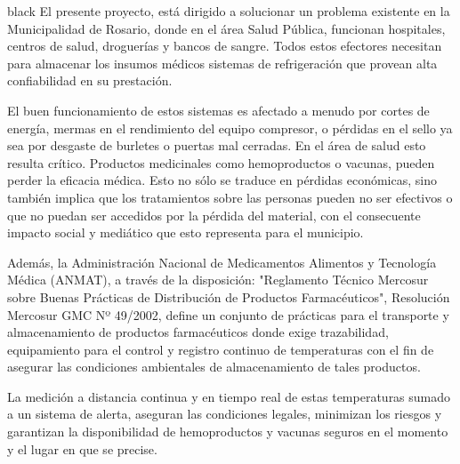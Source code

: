 \documentclass[11pt]{charter}
\begin{document}
\begin{consigna}{black}
El presente proyecto, está dirigido a solucionar un problema existente en la Municipalidad de Rosario, donde en el área Salud Pública, funcionan  hospitales, centros de salud, droguerías y bancos de sangre. Todos estos efectores necesitan para almacenar los insumos médicos sistemas de refrigeración que provean alta confiabilidad en su prestación.

El buen funcionamiento de estos sistemas es afectado a menudo por cortes de energía, mermas en el rendimiento del equipo compresor, o pérdidas en el sello ya sea por desgaste de burletes o puertas mal cerradas.
En el área de salud esto resulta crítico. Productos medicinales como hemoproductos o vacunas, pueden perder la eficacia médica. Esto no sólo se traduce en pérdidas económicas, sino también implica que los tratamientos sobre las personas pueden no ser efectivos o que no puedan ser accedidos por la pérdida del material, con el consecuente impacto social y mediático que esto representa para el municipio.

Además, la Administración Nacional de Medicamentos Alimentos y Tecnología Médica (ANMAT), a través de la disposición: "Reglamento Técnico Mercosur sobre Buenas Prácticas de Distribución de Productos Farmacéuticos", Resolución Mercosur GMC Nº 49/2002, define un conjunto de prácticas para el transporte y almacenamiento de productos farmacéuticos donde exige trazabilidad, equipamiento para el control y registro continuo de temperaturas con el fin de asegurar las condiciones ambientales de almacenamiento de tales productos. 

La medición a distancia continua y en tiempo real de estas temperaturas sumado a un sistema de alerta, aseguran las condiciones legales, minimizan los riesgos y garantizan la disponibilidad de hemoproductos y vacunas seguros en el momento y el lugar en que se precise. 


\end{consigna}
\end{document}
